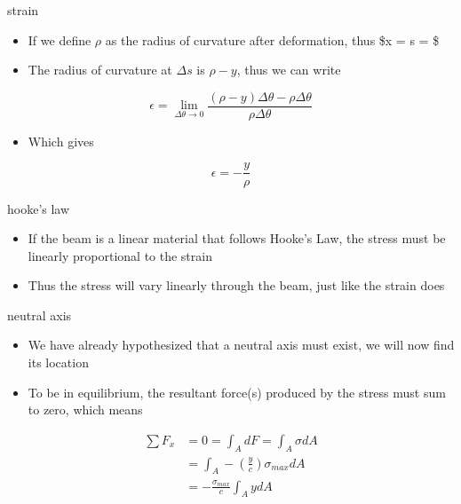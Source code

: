 \begin{frame}{strain}
\protect\hypertarget{strain-3}{}
\begin{itemize}
\tightlist
\item
  If we define \(\rho\) as the radius of curvature after deformation,
  thus \$\Delta x = \Delta s = \rho \Delta \theta \$
\item
  The radius of curvature at \(\Delta s\) is \(\rho - y\), thus we can
  write
\end{itemize}

\[\epsilon = \lim_{\Delta \theta \to 0} \frac{(\rho-y)\Delta \theta - \rho \Delta \theta}{\rho \Delta \theta}\]

\begin{itemize}
\tightlist
\item
  Which gives
\end{itemize}

\[\epsilon = -\frac{y}{\rho}\]
\end{frame}

\begin{frame}{hooke's law}
\protect\hypertarget{hookes-law}{}
\begin{itemize}
\tightlist
\item
  If the beam is a linear material that follows Hooke's Law, the stress
  must be linearly proportional to the strain
\item
  Thus the stress will vary linearly through the beam, just like the
  strain does
\end{itemize}
\end{frame}

\begin{frame}{neutral axis}
\protect\hypertarget{neutral-axis-1}{}
\begin{itemize}
\tightlist
\item
  We have already hypothesized that a neutral axis must exist, we will
  now find its location
\item
  To be in equilibrium, the resultant force(s) produced by the stress
  must sum to zero, which means
\end{itemize}

\[\begin{aligned}
  \sum F_x &= 0 = \int_A dF = \int_A \sigma dA\\
  &= \int_A -\left( \frac{y}{c} \right) \sigma_{max} dA\\
  &= -\frac{\sigma_{max}}{c} \int_A y dA
\end{aligned}\]
\end{frame}

